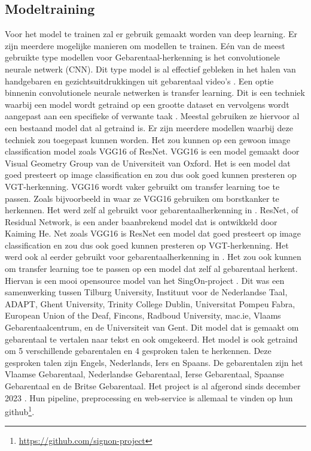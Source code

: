 \subsection{Modeltraining}
\label{subsec:modeltraining}
Voor het model te trainen zal er gebruik gemaakt worden van deep learning.
Er zijn meerdere mogelijke manieren om modellen te trainen. 
E{\'e}n van de meest gebruikte type modellen voor Gebarentaal-herkenning is het convolutionele neurale netwerk (CNN).
Dit type model is al effectief gebleken in het halen van handgebaren en gezichtsuitdrukkingen uit gebarentaal video's \autocite{10.17485/ijst/v16i45.2583}.
Een optie binnenin convolutionele neurale netwerken is transfer learning.
Dit is een techniek waarbij een model wordt getraind op een grootte dataset en vervolgens wordt aangepast aan een specifieke of verwante taak \autocite{torrey2010transfer}.
Meestal gebruiken ze hiervoor al een bestaand model dat al getraind is.
Er zijn meerdere modellen waarbij deze techniek zou toegepast kunnen worden.
Het zou kunnen op een gewoon image classification model zoals VGG16 of ResNet.
VGG16 is een model gemaakt door Visual Geometry Group van de Universiteit van Oxford.
Het is een model dat goed presteert op image classification en zou dus ook goed kunnen presteren op VGT-herkenning.
VGG16 wordt vaker gebruikt om transfer learning toe te passen.
Zoals bijvoorbeeld in \textcite{9491631} waar ze VGG16 gebruiken om borstkanker te herkennen.
Het werd zelf al gebruikt voor gebarentaalherkenning in \textcite{Abu-Jamie2022-ABUCOS-2}.
ResNet, of Residual Network, is een ander baanbrekend model dat is ontwikkeld door Kaiming He.
Net zoals VGG16 is ResNet een model dat goed presteert op image classification en zou dus ook goed kunnen presteren op VGT-herkenning.
Het werd ook al eerder gebruikt voor gebarentaalherkenning in \textcite{Wang2022}.
Het zou ook kunnen om transfer learning toe te passen op een model dat zelf al gebarentaal herkent.
Hiervan is een mooi opensource model van het SingOn-project \autocite{SingOn}. 
Dit was een samenwerking tussen Tilburg University, Instituut voor de Nederlandse Taal, ADAPT, Ghent University, Trinity College Dublin, Universitat Pompeu Fabra, European Union of the Deaf, Fincons, Radboud University, mac.ie, Vlaams Gebarentaalcentrum, en de Universiteit van Gent.
Dit model dat is gemaakt om gebarentaal te vertalen naar tekst en ook omgekeerd.
Het model is ook getraind om 5 verschillende gebarentalen en 4 gesproken talen te herkennen.
Deze gesproken talen zijn Engels, Nederlands, Iers en Spaans.
De gebarentalen zijn het Vlaamse Gebarentaal, Nederlandse Gebarentaal, Ierse Gebarentaal, Spaanse Gebarentaal en de Britse Gebarentaal.
Het project is al afgerond sinds december 2023 \autocite{shterionov-etal-2024-signon}.
Hun pipeline, preprocessing en web-service is allemaal te vinden op hun github\footnote{\url{https://github.com/signon-project}}.



